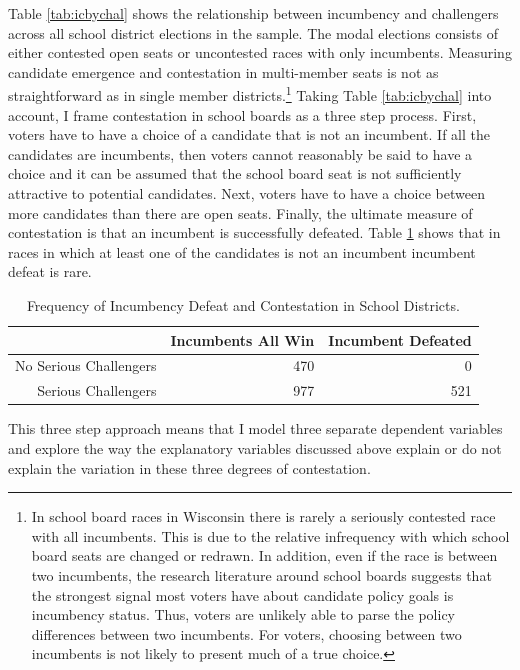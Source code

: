 Table \ref{tab:icbychal} shows the relationship between incumbency and challengers 
across all school district elections in the sample. The modal elections consists of either 
contested open seats or uncontested races with only incumbents. Measuring candidate 
emergence and contestation in multi-member seats is not as straightforward as in single 
member districts.\footnote{In school board races in Wisconsin there is rarely a seriously 
contested race with all incumbents. This is due to the relative infrequency with 
which school board seats are changed or redrawn. In addition, even if the race is 
between two incumbents, the research literature around school boards suggests 
that the strongest signal most voters have about candidate policy goals is incumbency status. 
Thus, voters are unlikely able to parse the policy differences between two incumbents. 
For voters, choosing between two incumbents is not likely to present much of a true choice.} Taking 
Table \ref{tab:icbychal} into account, I frame contestation in school 
boards as a three step process. First, voters have to have a choice of a candidate
that is not an incumbent. If all the candidates are incumbents, then voters cannot 
reasonably be said to have a choice and it can be assumed that the school board 
seat is not sufficiently attractive to potential candidates. Next, voters have to
have a choice between more candidates than there are open seats. Finally, the 
ultimate measure of contestation is that an incumbent is successfully defeated. 
Table \ref{tab:icbydef} shows that in races in which 
at least one of the candidates is not an incumbent incumbent defeat is rare. 

\begin{table}[ht]
\centering
\begin{tabular}{rrr}
  \hline
 & Incumbents All Win & Incumbent Defeated \\ 
  \hline
No Serious Challengers & 470 & 0 \\ 
  Serious Challengers & 977 & 521 \\ 
   \hline
\end{tabular}
\caption{Frequency of Incumbency Defeat and Contestation in School Districts.} 
\label{tab:icbydef}
\end{table}


This three step approach means that I model three separate dependent variables 
and explore the way the explanatory variables discussed above explain or do not 
explain the variation in these three degrees of contestation. 

